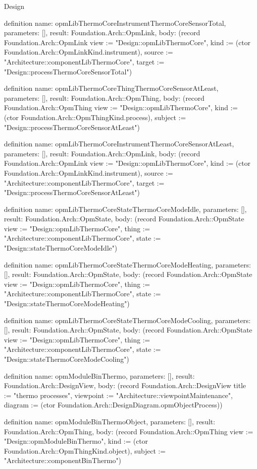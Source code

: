\begin{lexlean}{Design}
\begin{semanticmodule}
definition{
  name: opmLibThermoCoreInstrumentThermoCoreSensorTotal,
  parameters: [],
  result: Foundation.Arch::OpmLink,
  body: (record Foundation.Arch::OpmLink {view := "Design::opmLibThermoCore", kind := (ctor Foundation.Arch::OpmLinkKind.instrument), source := "Architecture::componentLibThermoCore", target := "Design::processThermoCoreSensorTotal"})
}

definition{
  name: opmLibThermoCoreThingThermoCoreSensorAtLeast,
  parameters: [],
  result: Foundation.Arch::OpmThing,
  body: (record Foundation.Arch::OpmThing {view := "Design::opmLibThermoCore", kind := (ctor Foundation.Arch::OpmThingKind.process), subject := "Design::processThermoCoreSensorAtLeast"})
}

definition{
  name: opmLibThermoCoreInstrumentThermoCoreSensorAtLeast,
  parameters: [],
  result: Foundation.Arch::OpmLink,
  body: (record Foundation.Arch::OpmLink {view := "Design::opmLibThermoCore", kind := (ctor Foundation.Arch::OpmLinkKind.instrument), source := "Architecture::componentLibThermoCore", target := "Design::processThermoCoreSensorAtLeast"})
}

definition{
  name: opmLibThermoCoreStateThermoCoreModeIdle,
  parameters: [],
  result: Foundation.Arch::OpmState,
  body: (record Foundation.Arch::OpmState {view := "Design::opmLibThermoCore", thing := "Architecture::componentLibThermoCore", state := "Design::stateThermoCoreModeIdle"})
}

definition{
  name: opmLibThermoCoreStateThermoCoreModeHeating,
  parameters: [],
  result: Foundation.Arch::OpmState,
  body: (record Foundation.Arch::OpmState {view := "Design::opmLibThermoCore", thing := "Architecture::componentLibThermoCore", state := "Design::stateThermoCoreModeHeating"})
}

definition{
  name: opmLibThermoCoreStateThermoCoreModeCooling,
  parameters: [],
  result: Foundation.Arch::OpmState,
  body: (record Foundation.Arch::OpmState {view := "Design::opmLibThermoCore", thing := "Architecture::componentLibThermoCore", state := "Design::stateThermoCoreModeCooling"})
}

definition{
  name: opmModuleBinThermo,
  parameters: [],
  result: Foundation.Arch::DesignView,
  body: (record Foundation.Arch::DesignView {title := "thermo processes", viewpoint := "Architecture::viewpointMaintenance", diagram := (ctor Foundation.Arch::DesignDiagram.opmObjectProcess)})
}

definition{
  name: opmModuleBinThermoObject,
  parameters: [],
  result: Foundation.Arch::OpmThing,
  body: (record Foundation.Arch::OpmThing {view := "Design::opmModuleBinThermo", kind := (ctor Foundation.Arch::OpmThingKind.object), subject := "Architecture::componentBinThermo"})
}


\end{semanticmodule}
\end{lexlean}
